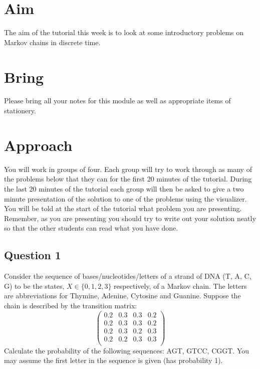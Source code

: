 \documentclass[a4paper]{article}
\begin{document}
\section{Aim}

The aim of the tutorial this week is to look at some introductory problems on Markov chains in discrete time.

\section{Bring}

Please bring all your notes for this module as well as appropriate items of stationery.

\section{Approach}

You will work in groups of four.  Each group will try to work through as many of the problems below that they can for the first 20 minutes of the tutorial.  During the last 20 minutes of the tutorial 
each group will then be asked to give a two minute presentation of the solution to one of the problems using the visualizer.  You will be told at the start of the tutorial what problem you are 
presenting.  Remember, as you are presenting you should try to write out your solution neatly so that the other students can read what you have done.

\subsection{Question 1}

Consider the sequence of
bases/nucleotides/letters of a strand of DNA (T, A, C, G) to be the states,
$ X \in \{0,1,2,3\} $ respectively, of a
Markov chain.
The letters are abbreviations for
Thymine, Adenine, Cytosine and Guanine.
Suppose the chain is  described by the transition matrix:
$$
\left(
\begin{matrix}
0.2 & 0.3 & 0.3 & 0.2 \\
0.2 & 0.3 & 0.3 & 0.2 \\
0.2 & 0.3 & 0.2 & 0.3 \\
0.2 & 0.2 & 0.3 & 0.3 \\
\end{matrix}
\right)
$$
Calculate the probability of the following sequences:
AGT,  GTCC,   CGGT.
You may assume the first letter in the sequence  is  given (has probability 1).
\end{document}
